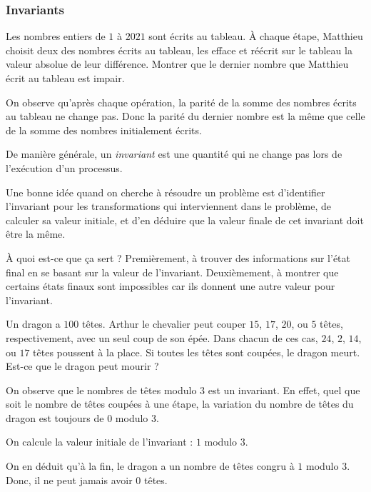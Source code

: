 \subsubsection{Invariants}


\begin{exo}
Les nombres entiers de $1$ à $2021$ sont écrits au tableau. À chaque étape, Matthieu choisit deux des nombres écrits au tableau, les efface et réécrit sur le tableau la valeur absolue de leur différence. Montrer que le dernier nombre que Matthieu écrit au tableau est impair.
\end{exo}

\begin{sol}
On observe qu'après chaque opération, la parité de la somme des nombres écrits au tableau ne change pas. Donc la parité du dernier nombre est la même que celle de la somme des nombres initialement écrits.
\end{sol}


De manière générale, un \emph{invariant} est une quantité qui ne change pas lors de l'exécution d'un processus.

Une bonne idée quand on cherche à résoudre un problème est d'identifier l'invariant pour les transformations qui interviennent dans le problème, de calculer sa valeur initiale, et d'en déduire que la valeur finale de cet invariant doit être la même.

À quoi est-ce que ça sert ? Premièrement, à trouver des informations sur l'état final en se basant sur la valeur de l'invariant. Deuxièmement, à montrer que certains états finaux sont impossibles car ils donnent une autre valeur pour l'invariant.

\begin{exo}
Un dragon a $100$ têtes. Arthur le chevalier peut couper $15$, $17$, $20$, ou $5$ têtes, respectivement, avec un seul coup de son épée.
Dans chacun de ces cas, $24$, $2$, $14$, ou $17$ têtes poussent à la place. Si toutes les têtes sont coupées, le dragon meurt. Est-ce que le dragon peut mourir ?
\end{exo}

\begin{sol}
On observe que le nombres de têtes modulo $3$ est un invariant. En effet, quel que soit le nombre de têtes coupées à une étape, la variation du nombre de têtes du dragon est toujours de $0$ modulo $3$.

On calcule la valeur initiale de l'invariant : $1$ modulo $3$.

On en déduit qu'à la fin, le dragon a un nombre de têtes congru à $1$ modulo $3$. Donc, il ne peut jamais avoir $0$ têtes.
\end{sol}



